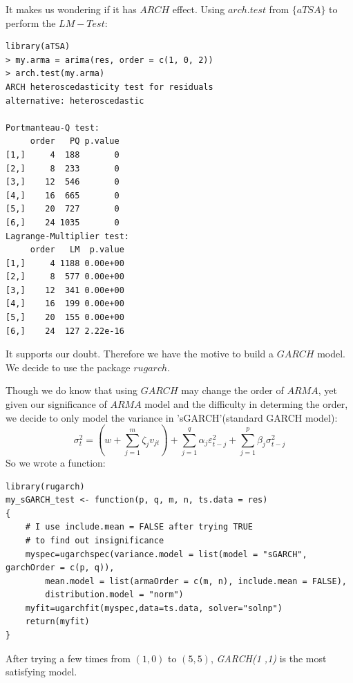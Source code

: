 \documentclass[a4paper, 11pt]{article}
\begin{document}
\indent It makes us wondering if it has $ARCH$ effect. Using $arch.test$ from $\{aTSA\}$ to perform the $LM-Test$:
\begin{verbatim}
library(aTSA)
> my.arma = arima(res, order = c(1, 0, 2))
> arch.test(my.arma)
ARCH heteroscedasticity test for residuals 
alternative: heteroscedastic 

Portmanteau-Q test: 
     order   PQ p.value
[1,]     4  188       0
[2,]     8  233       0
[3,]    12  546       0
[4,]    16  665       0
[5,]    20  727       0
[6,]    24 1035       0
Lagrange-Multiplier test: 
     order   LM  p.value
[1,]     4 1188 0.00e+00
[2,]     8  577 0.00e+00
[3,]    12  341 0.00e+00
[4,]    16  199 0.00e+00
[5,]    20  155 0.00e+00
[6,]    24  127 2.22e-16
\end{verbatim}
\indent It supports our doubt. Therefore we have the motive to build a $GARCH$ model. We decide to use the package $rugarch$.\par
Though we do know that using $GARCH$ may change the order of $ARMA$, yet given our significance of $ARMA$ model and the difficulty in determing the order, we decide to only model the variance in 'sGARCH'(standard GARCH model):
\begin{equation*}
	\sigma_t^2 = (w + \sum_{j = 1}^m \zeta_j v_{jt}) + \sum_{j = 1}^q \alpha_j \varepsilon_{t-j}^2 + \sum_{j = 1}^p \beta_j \sigma_{t-j}^2
\end{equation*} 
\indent So we wrote a function:
\begin{verbatim}
library(rugarch)
my_sGARCH_test <- function(p, q, m, n, ts.data = res)
{
	# I use include.mean = FALSE after trying TRUE
	# to find out insignificance
    myspec=ugarchspec(variance.model = list(model = "sGARCH", garchOrder = c(p, q)), 
    	mean.model = list(armaOrder = c(m, n), include.mean = FALSE), 
    	distribution.model = "norm")
    myfit=ugarchfit(myspec,data=ts.data, solver="solnp")
    return(myfit)  
}
\end{verbatim}
\indent After trying a few times from $(1, 0)$ to $(5, 5)$, \textit{GARCH(1 ,1)} is the most satisfying model.
\end{document}
